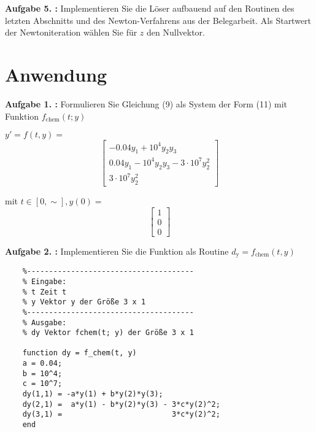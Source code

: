 \begin{figure}[htb]
	
\end{figure}

\begin{mybox}
	\textbf{Aufgabe 5. :}
	Implementieren Sie die Löser aufbauend auf den Routinen des letzten Abschnitts und des Newton-Verfahrens aus der Belegarbeit. Als Startwert der Newtoniteration wählen Sie für $z$ den Nullvektor.
\end{mybox}

\begin{figure}[htb]
	
\end{figure}
\section{Anwendung}
\begin{mybox}
	\textbf{Aufgabe 1. :} Formulieren Sie Gleichung (9) als System der Form (11) mit Funktion $f_{\mathrm{chem}}(t; y)$
\end{mybox}


$y' = f(t,y) = $
\begin{equation}
\begin{bmatrix}
	-0.04y_1 + 10^4y_2y_3 \\
	0.04y_1-10^4y_2y_3-3\cdot 10^7y^2_2 \\
	3 \cdot 10^7y^2_2 
\end{bmatrix}  
\end{equation}


mit $ t\in [0,\sim], y(0) = $ 
\begin{equation}
\begin{bmatrix}
	1 \\
	0 \\
	0
\end{bmatrix}
\end{equation}
\begin{mybox}
	\textbf{Aufgabe 2. :}  Implementieren Sie die Funktion als Routine $ d_\mathrm{y} = f_{\mathrm{chem}}(t,y) $
\end{mybox}



\begin{lstlisting}[style=Matlab-editor]
	% dy=f_chem(t,y)
	%--------------------------------------
	% Eingabe:
	% t Zeit t
	% y Vektor y der Größe 3 x 1
	%--------------------------------------
	% Ausgabe:
	% dy Vektor fchem(t; y) der Größe 3 x 1

	function dy = f_chem(t, y)
	a = 0.04;
	b = 10^4;
	c = 10^7;
	dy(1,1) = -a*y(1) + b*y(2)*y(3);
	dy(2,1) =  a*y(1) - b*y(2)*y(3) - 3*c*y(2)^2;
	dy(3,1) =                         3*c*y(2)^2;
	end
\end{lstlisting}


